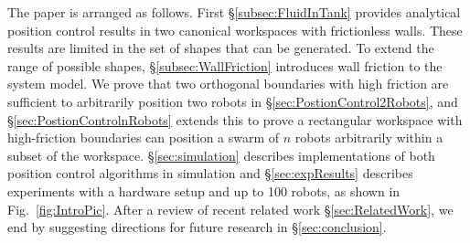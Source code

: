 The paper is arranged as follows. First \S\ref{subsec:FluidInTank} provides analytical position control results in two canonical workspaces with frictionless walls.  These results are limited in the set of shapes that can be generated.  To extend the range of possible shapes, \S \ref{subsec:WallFriction} introduces wall friction to the system model.  We prove that two orthogonal boundaries with high friction are sufficient to arbitrarily position two robots in \S \ref{sec:PostionControl2Robots}, and \S \ref{sec:PostionControlnRobots} extends this to prove a rectangular workspace with high-friction boundaries can position a swarm of $n$ robots arbitrarily within a subset of the workspace.
\S \ref{sec:simulation} describes implementations of both position control algorithms in simulation and  \S \ref{sec:expResults} describes experiments with a hardware setup and up to 100 robots, as shown in Fig.~\ref{fig:IntroPic}. After a review of recent related work \S \ref{sec:RelatedWork}, we end by suggesting directions for future research in \S \ref{sec:conclusion}.

